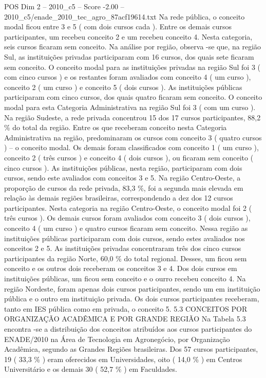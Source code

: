 \begin{textsample}{POS Dim 2 – 2010\_c5 – Score -2.00 – 2010\_c5/enade\_2010\_tec\_agro\_87acf19614.txt}
Na rede pública, o conceito modal ficou entre 3 e 5 ( com dois cursos cada ).
Entre os demais cursos participantes, um recebeu conceito 2 e um recebeu conceito 4.
Nesta categoria, seis cursos ficaram sem conceito.
Na análise por região, observa -se que, na região Sul, as instituições privadas participaram com 16 cursos, dos quais sete ficaram sem conceito.
O conceito modal para as instituições privadas na região Sul foi 3 ( com cinco cursos ) e os restantes foram avaliados com conceito 4 ( um curso ), conceito 2 ( um curso ) e conceito 5 ( dois cursos ).
As instituições públicas participaram com cinco cursos, dos quais quatro ficaram sem conceito.
O conceito modal para esta Categoria Administrativa na região Sul foi 3 ( com um curso ).
Na região Sudeste, a rede privada concentrou 15 dos 17 cursos participantes, 88,2 \% do total da região.
Entre os que receberam conceito nesta Categoria Administrativa na região, predominaram os cursos com conceito 3 ( quatro cursos ) – o conceito modal.
Os demais foram classificados com conceito 1 ( um curso ), conceito 2 ( três cursos ) e conceito 4 ( dois cursos ), ou ficaram sem conceito ( cinco cursos ).
As instituições públicas, nesta região, participaram com dois cursos, sendo este avaliados com conceitos 3 e 5.
Na região Centro-Oeste, a proporção de cursos da rede privada, 83,3 \%, foi a segunda mais elevada em relação às demais regiões brasileiras, correspondendo a dez dos 12 cursos participantes.
Nesta categoria na região Centro-Oeste, o conceito modal foi 2 ( três cursos ).
Os demais cursos foram avaliados com conceito 3 ( dois cursos ), conceito 4 ( um curso ) e quatro cursos ficaram sem conceito.
Nessa região as instituições públicas participaram com dois cursos, sendo estes avaliados nos conceitos 2 e 5.
As instituições privadas concentraram três dos cinco cursos participantes da região Norte, 60,0 \% do total regional.
Desses, um ficou sem conceito e os outros dois receberam os conceitos 3 e 4.
Dos dois cursos em instituições públicas, um ficou sem conceito e o ourro recebeu conceito 4.
Na região Nordeste, foram apenas dois cursos participantes, sendo um em instituição pública e o outro em instituição privada.
Os dois cursos participantes receberam, tanto em IES pública como em privada, o conceito 5. 5.3 CONCEITOS POR ORGANIZAÇÃO ACADÊMICA E POR GRANDE REGIÃO Na Tabela 5.3 encontra -se a distribuição dos conceitos atribuídos aos cursos participantes do ENADE/2010 na Área de Tecnologia em Agronegócio, por Organização Acadêmica, segundo as Grandes Regiões brasileiras.
Dos 57 cursos participantes, 19 ( 33,3 \% ) eram oferecidos em Universidades, oito ( 14,0 \% ) em Centros Universitário e os demais 30 ( 52,7 \% ) em Faculdades.

\end{textsample}
